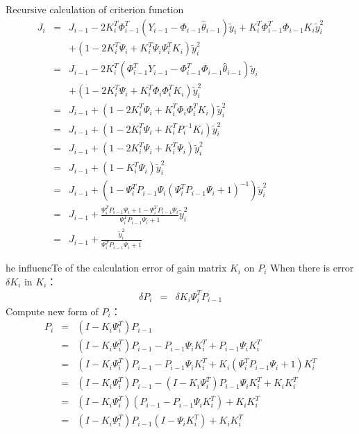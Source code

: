 \begin{frame}{ Recursive calculation of criterion function }
\begin{eqnarray*}
J_i &=& J_{i-1} - 2 K_i^T\Phi_{i-1}^T(Y_{i-1}-\Phi_{i-1}\hat\theta_{i-1})\tilde y_i + K_i^T \Phi_{i-1}^T\Phi_{i-1} K_i \tilde y_i^2  \\
&& +(1-2K_i^T\Psi_i+K_i^T\Psi_i\Psi_i^T K_i)\tilde y_i^2   \\
&=& J_{i-1} - 2 K_i^T(\Phi_{i-1}^TY_{i-1}-\Phi_{i-1}^T\Phi_{i-1}\hat\theta_{i-1})\tilde y_i  \\
&&  +(1-2K_i^T\Psi_i+K_i^T\Phi_i\Phi_i^T K_i)\tilde y_i^2   \\
&=& J_{i-1}  +  (1-2K_i^T\Psi_i+K_i^T\Phi_i\Phi_i^T K_i)\tilde y_i^2   \\
&=& J_{i-1}  +  (1-2K_i^T\Psi_i+K_i^T P_i^{-1} K_i)\tilde y_i^2   \\
&=& J_{i-1}  +  (1-2K_i^T\Psi_i+K_i^T \Psi_i)\tilde y_i^2   \\
&=& J_{i-1}  +  (1-K_i^T\Psi_i)\tilde y_i^2   \\
&=& J_{i-1}  +  (1-\Psi_i^T P_{i-1} \Psi_i(\Psi_i^T P_{i-1} \Psi_i+1)^{-1}) \tilde y_i^2 \\
&=& J_{i-1}  +  \frac{\Psi_i^T P_{i-1} \Psi_i+1-\Psi_i^T P_{i-1} \Psi_i}{\Psi_i^T P_{i-1} \Psi_i+1} \tilde y_i^2 \\
&=& J_{i-1}  +  \frac{\tilde y_i^2}{\Psi_i^T P_{i-1} \Psi_i+1}  
\end{eqnarray*}
\end{frame}
\begin{frame}{he influencTe of the calculation error of gain matrix $K_i$ on $P_i$}
When there is error $\delta K_i$ in $K_i$：
\begin{eqnarray*}
\delta P_i &=& \delta K_i \Psi_i^T P_{i-1}
\end{eqnarray*}
Compute new form of $P_i$：
\begin{eqnarray*}
P_i &=& (I-K_i\Psi_i^T)P_{i-1}  \\
&=& (I-K_i\Psi_i^T)P_{i-1} -P_{i-1}\Psi_i K_i^T+P_{i-1}\Psi_i K_i^T \\
&=& (I-K_i\Psi_i^T)P_{i-1} -P_{i-1}\Psi_i K_i^T+K_i(\Psi_i^T P_{i-1}\Psi_i+1)K_i^T \\
&=& (I-K_i\Psi_i^T)P_{i-1} -(I-K_i\Psi_i^T)P_{i-1}\Psi_i K_i^T+K_i K_i^T \\
&=& (I-K_i\Psi_i^T)(P_{i-1} -P_{i-1}\Psi_i K_i^T)+K_i K_i^T \\
&=& (I-K_i\Psi_i^T)P_{i-1} (I-\Psi_i K_i^T)+K_i K_i^T 
\end{eqnarray*}
\end{frame}


